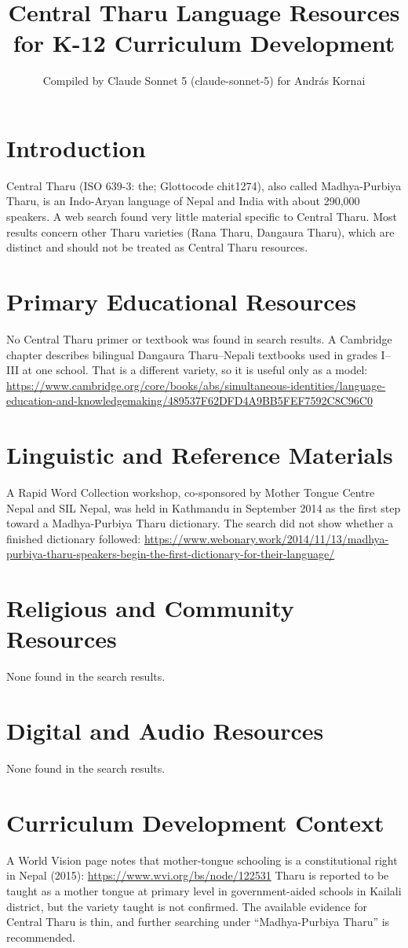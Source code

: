 \documentclass[12pt]{article}
\title{Central Tharu Language Resources for K-12 Curriculum Development}
\author{Compiled by Claude Sonnet 5 (claude-sonnet-5) for Andr\'as Kornai}
\date{}
\begin{document}
\maketitle

\section{Introduction}
Central Tharu (ISO 639-3: the; Glottocode chit1274), also called Madhya-Purbiya Tharu, is an Indo-Aryan language of Nepal and India with about 290,000 speakers. A web search found very little material specific to Central Tharu. Most results concern other Tharu varieties (Rana Tharu, Dangaura Tharu), which are distinct and should not be treated as Central Tharu resources.

\section{Primary Educational Resources}
No Central Tharu primer or textbook was found in search results. A Cambridge chapter describes bilingual Dangaura Tharu--Nepali textbooks used in grades I--III at one school. That is a different variety, so it is useful only as a model:
\url{https://www.cambridge.org/core/books/abs/simultaneous-identities/language-education-and-knowledgemaking/489537F62DFD4A9BB5FEF7592C8C96C0}

\section{Linguistic and Reference Materials}
A Rapid Word Collection workshop, co-sponsored by Mother Tongue Centre Nepal and SIL Nepal, was held in Kathmandu in September 2014 as the first step toward a Madhya-Purbiya Tharu dictionary. The search did not show whether a finished dictionary followed:
\url{https://www.webonary.work/2014/11/13/madhya-purbiya-tharu-speakers-begin-the-first-dictionary-for-their-language/}

\section{Religious and Community Resources}
None found in the search results.

\section{Digital and Audio Resources}
None found in the search results.

\section{Curriculum Development Context}
A World Vision page notes that mother-tongue schooling is a constitutional right in Nepal (2015):
\url{https://www.wvi.org/bs/node/122531}
Tharu is reported to be taught as a mother tongue at primary level in government-aided schools in Kailali district, but the variety taught is not confirmed. The available evidence for Central Tharu is thin, and further searching under ``Madhya-Purbiya Tharu'' is recommended.
\end{document}
